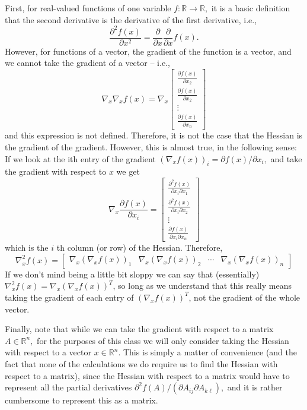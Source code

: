 \documentclass[10pt,a4paper,oneside]{article}
\begin{document}
First, for real-valued functions of one variable \(f : \mathbb{R} \rightarrow \mathbb{R},\) it is a basic definition that the second derivative is the derivative of the first derivative, i.e.,
\[
\frac{\partial^{2} f(x)}{\partial x^{2}}=\frac{\partial}{\partial x} \frac{\partial}{\partial x} f(x).
\]
However, for functions of a vector, the gradient of the function is a vector, and we cannot take the gradient of a vector -- i.e.,
\[
\nabla_{x} \nabla_{x} f(x)=\nabla_{x}\left[\begin{array}{c}{\frac{\partial f(x)}{\partial x_{2}}} \\ {\frac{\partial f(x)}{\partial x_{2}}} \\ {\vdots} \\ {\frac{\partial f(x)}{\partial x_{n}}}\end{array}\right]
\]
and this expression is not defined. Therefore, it is not the case that the Hessian is the gradient of the gradient. However, this is almost true, in the following sense: If we look at the ith entry of the gradient \(\left(\nabla_{x} f(x)\right)_{i}=\partial f(x) / \partial x_{i},\) and take the gradient with respect to \(x\) we get
\[
\nabla_{x} \frac{\partial f(x)}{\partial x_{i}}=\left[\begin{array}{c}{\frac{\partial^{2} f(x)}{\partial x_{i} \partial x_{1}}} \\ {\frac{\partial^{2} f(x)}{\partial x_{i} \partial x_{2}}} \\ {\vdots} \\ {\frac{\partial f(x)}{\partial x_{i} \partial x_{n}}}\end{array}\right]
\]
which is the \(i\) th column (or row) of the Hessian. Therefore,
\[
\nabla_{x}^{2} f(x)=\left[\begin{array}{cccccc}{\nabla_{x}\left(\nabla_{x} f(x)\right)_{1}} & {\nabla_{x}\left(\nabla_{x} f(x)\right)_{2}} & {\cdots} & {\nabla_{x}\left(\nabla_{x} f(x)\right)_{n}}\end{array}\right]
\]
If we don't mind being a little bit sloppy we can say that (essentially) \(\nabla_{x}^{2}f(x)=\nabla_{x}\left(\nabla_{x} f(x)\right)^{T}\), so long as we understand that this really means taking the gradient of each entry of \(\left(\nabla_{x} f(x)\right)^{T}\), not the gradient of the whole vector.

Finally, note that while we can take the gradient with respect to a matrix \(A \in \mathbb{R}^{n},\) for the purposes of this class we will only consider taking the Hessian with respect to a vector \(x \in \mathbb{R}^{n}\). This is simply a matter of convenience (and the fact that none of the calculations we do require us to find the Hessian with respect to a matrix), since the Hessian with respect to a matrix would have to represent all the partial derivatives \(\partial^{2} f(A) /\left(\partial A_{i j} \partial A_{k \ell}\right),\) and it is rather cumbersome to represent this as a matrix.
\end{document}
